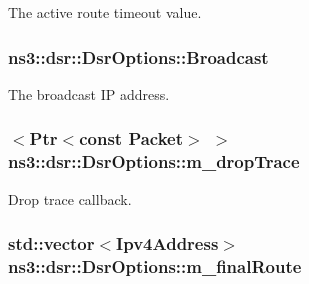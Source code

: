 The active route timeout value. 

\subsubsection[{\texorpdfstring{Broadcast}{Broadcast}}]{ ns3\+::dsr\+::\+Dsr\+Options\+::\+Broadcast\hspace{0.3cm}{\ttfamily [protected]}}\hypertarget{classns3_1_1dsr_1_1DsrOptions_a7e9380217477ad3d3e6b073edb64382d}{}\label{classns3_1_1dsr_1_1DsrOptions_a7e9380217477ad3d3e6b073edb64382d}


The broadcast IP address. 

\subsubsection[{\texorpdfstring{m\+\_\+drop\+Trace}{m_dropTrace}}]{$<${\bf Ptr}$<$const {\bf Packet}$>$ $>$ ns3\+::dsr\+::\+Dsr\+Options\+::m\+\_\+drop\+Trace\hspace{0.3cm}{\ttfamily [protected]}}\hypertarget{classns3_1_1dsr_1_1DsrOptions_a176bbc9efb58b6d750c14b9b03c525c4}{}\label{classns3_1_1dsr_1_1DsrOptions_a176bbc9efb58b6d750c14b9b03c525c4}


Drop trace callback. 

\subsubsection[{\texorpdfstring{m\+\_\+final\+Route}{m_finalRoute}}]{\setlength{\rightskip}{0pt plus 5cm}std\+::vector$<${\bf Ipv4\+Address}$>$ ns3\+::dsr\+::\+Dsr\+Options\+::m\+\_\+final\+Route\hspace{0.3cm}{\ttfamily [protected]}}\hypertarget{classns3_1_1dsr_1_1DsrOptions_a3fe6a72ebaae73724ce63383635b7af8}{}\label{classns3_1_1dsr_1_1DsrOptions_a3fe6a72ebaae73724ce63383635b7af8}


